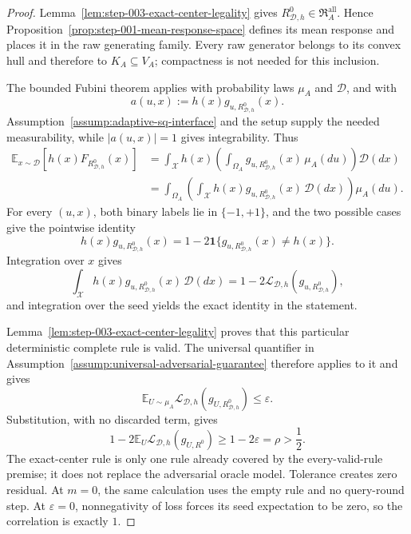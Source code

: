 \begin{proof}
Lemma~\ref{lem:step-003-exact-center-legality} gives
\(R^0_{\mathcal D,h}\in\mathfrak R_A^{\mathrm{all}}\).  Hence
Proposition~\ref{prop:step-001-mean-response-space} defines its mean response
and places it in the raw generating family.  Every raw generator belongs to
its convex hull and therefore to \(K_A\subseteq V_A\); compactness is not
needed for this inclusion.

The bounded Fubini theorem \citep{folland1999real} applies with probability
laws \(\mu_A\) and \(\mathcal D\), and with
\[
a(u,x):=h(x)g_{u,R^0_{\mathcal D,h}}(x).
\]
Assumption~\ref{assump:adaptive-sq-interface} and the setup supply the needed
measurability, while \(|a(u,x)|=1\) gives integrability.  Thus
\[
\begin{aligned}
\mathbb E_{x\sim\mathcal D}[h(x)F_{R^0_{\mathcal D,h}}(x)]
&=\int_{\mathcal X}h(x)
\left(\int_{\Omega_A}g_{u,R^0_{\mathcal D,h}}(x)\,\mu_A(du)\right)
\mathcal D(dx)\\
&=\int_{\Omega_A}\left(\int_{\mathcal X}
h(x)g_{u,R^0_{\mathcal D,h}}(x)\,\mathcal D(dx)\right)\mu_A(du).
\end{aligned}
\]
For every \((u,x)\), both binary labels lie in \(\{-1,+1\}\), and the two
possible cases give the pointwise identity
\[
h(x)g_{u,R^0_{\mathcal D,h}}(x)
=1-2\mathbf 1\{g_{u,R^0_{\mathcal D,h}}(x)\ne h(x)\}.
\]
Integration over \(x\) gives
\[
\int_{\mathcal X}h(x)g_{u,R^0_{\mathcal D,h}}(x)\,\mathcal D(dx)
=1-2\mathcal L_{\mathcal D,h}(g_{u,R^0_{\mathcal D,h}}),
\]
and integration over the seed yields the exact identity in the statement.

Lemma~\ref{lem:step-003-exact-center-legality} proves that this particular
deterministic complete rule is valid.  The universal quantifier in
Assumption~\ref{assump:universal-adversarial-guarantee} therefore applies to
it and gives
\[
\mathbb E_{U\sim\mu_A}
\mathcal L_{\mathcal D,h}(g_{U,R^0_{\mathcal D,h}})\le\varepsilon.
\]
Substitution, with no discarded term, gives
\[
1-2\mathbb E_U\mathcal L_{\mathcal D,h}(g_{U,R^0})
\ge1-2\varepsilon=\rho>\frac12.
\]
The exact-center rule is only one rule already covered by the every-valid-rule
premise; it does not replace the adversarial oracle model.  Tolerance creates
zero residual.  At \(m=0\), the same calculation uses the empty rule and no
query-round step.  At \(\varepsilon=0\), nonnegativity of loss forces its seed
expectation to be zero, so the correlation is exactly \(1\).
\end{proof}

